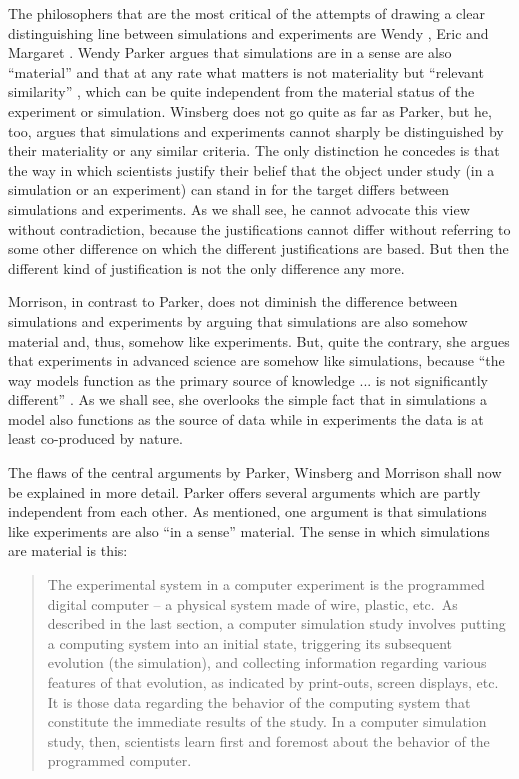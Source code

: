 \documentclass[12pt, a4paper]{article}
\numberwithin{equation}{section}
\begin{document}
The philosophers that are the most critical of the attempts of drawing a clear distinguishing line between simulations and experiments are Wendy \citet{parker:2009}, Eric \citet{winsberg:2009, winsberg:2010} and Margaret \cite{morrison:2009}. Wendy Parker argues that simulations are in a sense are also ``material'' and that at any rate what matters is not materiality but ``relevant similarity'' \citep[p.\ 484]{parker:2009}, which can be quite independent from the material status of the experiment or simulation. Winsberg does not go quite as far as Parker, but he, too, argues that simulations and experiments cannot sharply be distinguished by their materiality or any similar criteria. The only distinction he concedes is that the way in which scientists justify their belief that the object under study (in a simulation or an experiment) can stand in for the target differs between simulations and experiments. As we shall see, he cannot advocate this view without contradiction, because the justifications cannot differ without referring to some other difference on which the different justifications are based. But then the different kind of justification is not the only difference any more.

Morrison, in contrast to Parker, does not diminish the difference between simulations and experiments by arguing that simulations are also somehow material and, thus, somehow like experiments. But, quite the contrary, she argues that experiments in advanced science are somehow like simulations, because ``the way models function as the primary source of knowledge ... is not significantly different'' \citep[p.\ 43]{morrison:2009}. As we shall see, she overlooks the simple fact that in simulations a model also functions as the source of data while in experiments the data is at least co-produced by nature.

The flaws of the central arguments by Parker, Winsberg and Morrison shall now be explained in more detail. Parker offers several arguments which are partly independent from each other. As mentioned, one argument is that simulations like experiments are also ``in a sense'' material. The sense in which simulations are material is this: 

\begin{quotation}
The experimental system in a computer experiment is the programmed digital computer
-- a physical system made of wire, plastic, etc.\ As described in the last section, a computer simulation study involves putting a computing system into an initial state, triggering its subsequent evolution (the simulation), and collecting information regarding various features of that evolution, as indicated by print-outs, screen displays, etc. It is those data regarding the behavior of the computing system that constitute the immediate results of the study. In a computer simulation study, then, scientists learn first and foremost about the behavior of the programmed computer. \citep[p.\ 488f.]{parker:2009}
\end{quotation}
\end{document}
